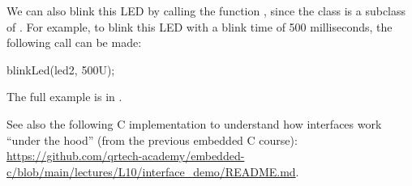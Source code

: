 \noindent We can also blink this LED by calling the function , since the class
 is a subclass of . For example, to blink
this LED with a blink time of 500 milliseconds, the following call can be made:

\begin{cppcode}
blinkLed(led2, 500U);
\end{cppcode}

\noindent The full example is in .

See also the following C implementation to understand how interfaces work ``under the hood'' (from
the previous embedded C course):
\url{https://github.com/qrtech-academy/embedded-c/blob/main/lectures/L10/interface_demo/README.md}.
